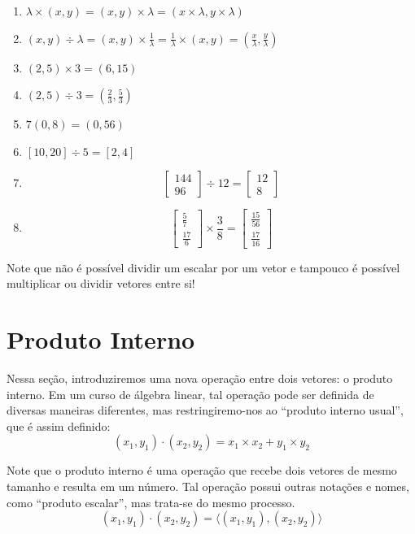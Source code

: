 \documentclass[
  letterpaper,
  DIV=11,
  numbers=noendperiod]{scrreprt}
\providecommand{\tightlist}{%
  \setlength{\itemsep}{0pt}\setlength{\parskip}{0pt}}\usepackage{longtable,booktabs,array}
\begin{document}
\begin{enumerate}
\def\labelenumi{\arabic{enumi}.}
\tightlist
\item
  \(\lambda \times (x,y) = (x,y) \times \lambda = (x \times \lambda, y \times \lambda)\)
\item
  \((x,y) \div \lambda = (x,y) \times \frac{1}{\lambda} = \frac{1}{\lambda} \times (x,y) = (\frac{x}{\lambda}, \frac{y}{\lambda})\)
\item
  \((2,5) \times 3 = (6,15)\)
\item
  \((2,5) \div 3 = (\frac{2}{3}, \frac{5}{3})\)
\item
  \(7(0, 8) = (0,56)\)
\item
  \([10, 20] \div 5 = [2, 4]\)
\item
  \[
  \begin{bmatrix} 144  \\  96 \end{bmatrix} \div
  12=
  \begin{bmatrix} 12  \\  8 \end{bmatrix}
  \]
\item
  \[
  \begin{bmatrix} \frac{5}{7}  \\  \frac{17}{6} \end{bmatrix} \times
  \frac{3}{8} =
  \begin{bmatrix} \frac{15}{56}  \\  \frac{17}{16} \end{bmatrix}
  \]
\end{enumerate}

Note que não é possível dividir um escalar por um vetor e tampouco é
possível multiplicar ou dividir vetores entre si!

\section{Produto Interno}\label{produto-interno}

Nessa seção, introduziremos uma nova operação entre dois vetores: o
produto interno. Em um curso de álgebra linear, tal operação pode ser
definida de diversas maneiras diferentes, mas restringiremo-nos ao
``produto interno usual'', que é assim definido: \[
(x_1, y_1) \cdot (x_2, y_2) = x_1 \times x_2 + y_1 \times y_2
\]

Note que o produto interno é uma operação que recebe dois vetores de
mesmo tamanho e resulta em um número. Tal operação possui outras
notações e nomes, como ``produto escalar'', mas trata-se do mesmo
processo. \[
(x_1, y_1) \cdot (x_2, y_2) = \langle (x_1, y_1),(x_2, y_2) \rangle
\]
\end{document}
